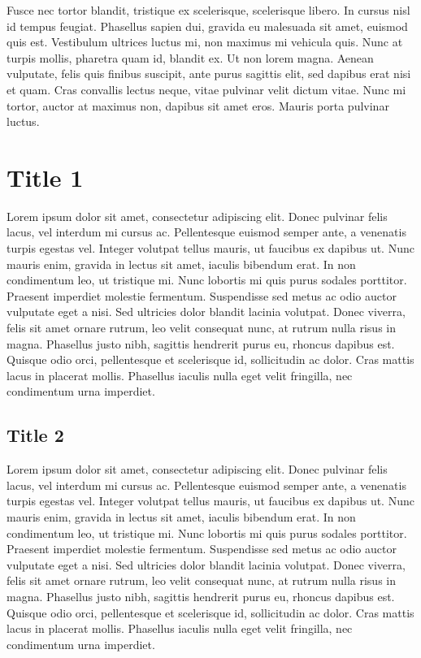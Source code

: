 \documentclass{ideathon2026}
\begin{document}
Fusce nec tortor blandit, tristique ex scelerisque, scelerisque libero. In cursus nisl id tempus feugiat. Phasellus sapien dui, gravida eu malesuada sit amet, euismod quis est. Vestibulum ultrices luctus mi, non maximus mi vehicula quis. Nunc at turpis mollis, pharetra quam id, blandit ex. Ut non lorem magna. Aenean vulputate, felis quis finibus suscipit, ante purus sagittis elit, sed dapibus erat nisi et quam. Cras convallis lectus neque, vitae pulvinar velit dictum vitae. Nunc mi tortor, auctor at maximus non, dapibus sit amet eros. Mauris porta pulvinar luctus.

\section{Title 1}

Lorem ipsum dolor sit amet, consectetur adipiscing elit. Donec pulvinar felis lacus, vel interdum mi cursus ac. Pellentesque euismod semper ante, a venenatis turpis egestas vel. Integer volutpat tellus mauris, ut faucibus ex dapibus ut. Nunc mauris enim, gravida in lectus sit amet, iaculis bibendum erat. In non condimentum leo, ut tristique mi. Nunc lobortis mi quis purus sodales porttitor. Praesent imperdiet molestie fermentum. Suspendisse sed metus ac odio auctor vulputate eget a nisi. Sed ultricies dolor blandit lacinia volutpat. Donec viverra, felis sit amet ornare rutrum, leo velit consequat nunc, at rutrum nulla risus in magna. Phasellus justo nibh, sagittis hendrerit purus eu, rhoncus dapibus est. Quisque odio orci, pellentesque et scelerisque id, sollicitudin ac dolor. Cras mattis lacus in placerat mollis. Phasellus iaculis nulla eget velit fringilla, nec condimentum urna imperdiet.

\subsection{Title 2}

Lorem ipsum dolor sit amet, consectetur adipiscing elit. Donec pulvinar felis lacus, vel interdum mi cursus ac. Pellentesque euismod semper ante, a venenatis turpis egestas vel. Integer volutpat tellus mauris, ut faucibus ex dapibus ut. Nunc mauris enim, gravida in lectus sit amet, iaculis bibendum erat. In non condimentum leo, ut tristique mi. Nunc lobortis mi quis purus sodales porttitor. Praesent imperdiet molestie fermentum. Suspendisse sed metus ac odio auctor vulputate eget a nisi. Sed ultricies dolor blandit lacinia volutpat. Donec viverra, felis sit amet ornare rutrum, leo velit consequat nunc, at rutrum nulla risus in magna. Phasellus justo nibh, sagittis hendrerit purus eu, rhoncus dapibus est. Quisque odio orci, pellentesque et scelerisque id, sollicitudin ac dolor. Cras mattis lacus in placerat mollis. Phasellus iaculis nulla eget velit fringilla, nec condimentum urna imperdiet.
\end{document}

